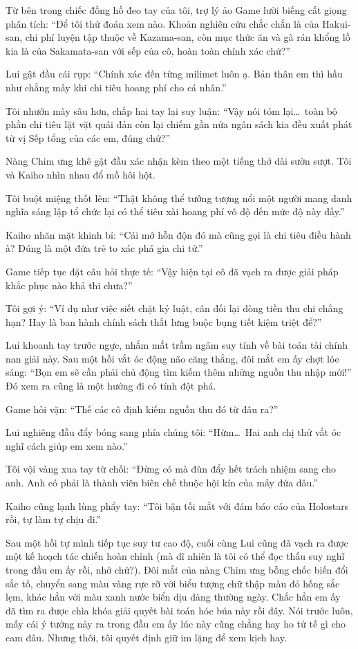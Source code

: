\documentclass[../main.tex]{subfiles}
\begin{document}
Từ bên trong chiếc đồng hồ đeo tay của tôi, trợ lý ảo Game lười biếng cất giọng phân tích: ``Để tôi thử đoán xem nào. Khoản nghiên cứu chắc chắn là của Hakui-san, chi phí luyện tập thuộc về Kazama-san, còn mục thức ăn và gà rán khổng lồ kia là của Sakamata-san với sếp của cô, hoàn toàn chính xác chứ?''

Lui gật đầu cái rụp: ``Chính xác đến từng milimet luôn ạ. Bản thân em thì hầu như chẳng mấy khi chi tiêu hoang phí cho cá nhân.''

Tôi nhướn mày sâu hơn, chắp hai tay lại suy luận: ``Vậy nói tóm lại\dots\ toàn bộ phần chi tiêu lặt vặt quái đản còn lại chiếm gần nửa ngân sách kia đều xuất phát từ vị Sếp tổng của các em, đúng chứ?''

Nàng Chim ưng khẽ gật đầu xác nhận kèm theo một tiếng thở dài sườn sượt. Tôi và Kaiho nhìn nhau đổ mồ hôi hột.

Tôi buột miệng thốt lên: ``Thật không thể tưởng tượng nổi một người mang danh nghĩa sáng lập tổ chức lại có thể tiêu xài hoang phí vô độ đến mức độ này đấy.''

Kaiho nhăn mặt khinh bỉ: ``Cái mớ hỗn độn đó mà cũng gọi là chi tiêu điều hành à? Đúng là một đứa trẻ to xác phá gia chi tử.''

Game tiếp tục đặt câu hỏi thực tế: ``Vậy hiện tại cô đã vạch ra được giải pháp khắc phục nào khả thi chưa?''

Tôi gợi ý: ``Ví dụ như việc siết chặt kỷ luật, cân đối lại dòng tiền thu chi chẳng hạn? Hay là ban hành chính sách thắt lưng buộc bụng tiết kiệm triệt để?''

Lui khoanh tay trước ngực, nhắm mắt trầm ngâm suy tính về bài toán tài chính nan giải này. Sau một hồi vắt óc động não căng thẳng, đôi mắt em ấy chợt lóe sáng: ``Bọn em sẽ cần phải chủ động tìm kiếm thêm những nguồn thu nhập mới!'' Đó xem ra cũng là một hướng đi có tính đột phá.

Game hỏi vặn: ``Thế các cô định kiếm nguồn thu đó từ đâu ra?''

Lui nghiêng đầu đẩy bóng sang phía chúng tôi: ``Hừm\dots\ Hai anh chị thử vắt óc nghĩ cách giúp em xem nào.''

Tôi vội vàng xua tay từ chối: ``Đừng có mà đùn đẩy hết trách nhiệm sang cho anh. Anh có phải là thành viên biên chế thuộc hội kín của mấy đứa đâu.''

Kaiho cũng lạnh lùng phẩy tay: ``Tôi bận tối mắt với đám báo cáo của Holostars rồi, tự làm tự chịu đi.''

Sau một hồi tự mình tiếp tục suy tư cao độ, cuối cùng Lui cũng đã vạch ra được một kế hoạch tác chiến hoàn chỉnh (mà dĩ nhiên là tôi có thể đọc thấu suy nghĩ trong đầu em ấy rồi, nhớ chứ?). Đôi mắt của nàng Chim ưng bỗng chốc biến đổi sắc tố, chuyển sang màu vàng rực rỡ với biểu tượng chữ thập màu đỏ hồng sắc lẹm, khác hẳn với màu xanh nước biển dịu dàng thường ngày. Chắc hẳn em ấy đã tìm ra được chìa khóa giải quyết bài toán hóc búa này rồi đây. Nói trước luôn, mấy cái ý tưởng nảy ra trong đầu em ấy lúc này cũng chẳng hay ho tử tế gì cho cam đâu. Nhưng thôi, tôi quyết định giữ im lặng để xem kịch hay.
\end{document}
